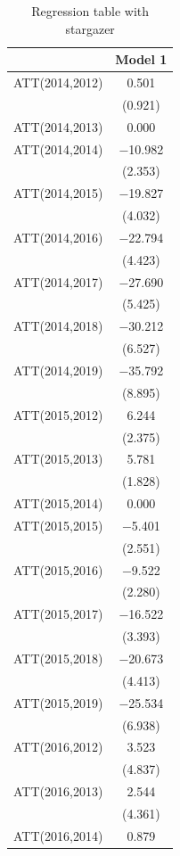 \documentclass[
]{article}
\begin{document}
\begin{table}

\caption{\label{tab:table-4}Regression table with stargazer}
\centering
\begin{tabular}[t]{lc}
\toprule
  & Model 1\\
\midrule
ATT(2014,2012) & \num{0.501}\\
 & (\num{0.921})\\
ATT(2014,2013) & \num{0.000}\\
ATT(2014,2014) & \num{-10.982}\\
 & (\num{2.353})\\
ATT(2014,2015) & \num{-19.827}\\
 & (\num{4.032})\\
ATT(2014,2016) & \num{-22.794}\\
 & (\num{4.423})\\
ATT(2014,2017) & \num{-27.690}\\
 & (\num{5.425})\\
ATT(2014,2018) & \num{-30.212}\\
 & (\num{6.527})\\
ATT(2014,2019) & \num{-35.792}\\
 & (\num{8.895})\\
ATT(2015,2012) & \num{6.244}\\
 & (\num{2.375})\\
ATT(2015,2013) & \num{5.781}\\
 & (\num{1.828})\\
ATT(2015,2014) & \num{0.000}\\
ATT(2015,2015) & \num{-5.401}\\
 & (\num{2.551})\\
ATT(2015,2016) & \num{-9.522}\\
 & (\num{2.280})\\
ATT(2015,2017) & \num{-16.522}\\
 & (\num{3.393})\\
ATT(2015,2018) & \num{-20.673}\\
 & (\num{4.413})\\
ATT(2015,2019) & \num{-25.534}\\
 & (\num{6.938})\\
ATT(2016,2012) & \num{3.523}\\
 & (\num{4.837})\\
ATT(2016,2013) & \num{2.544}\\
 & (\num{4.361})\\
ATT(2016,2014) & \num{0.879}\\

\end{tabular}
\end{table}
\end{document}
